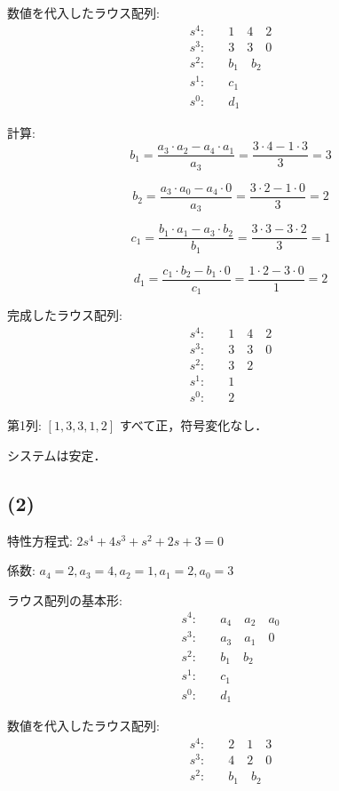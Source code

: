 \documentclass[11pt,a4paper]{ltjsarticle}
\begin{document}
数値を代入したラウス配列:
\begin{align*}
s^4: & \quad 1 \quad 4 \quad 2 \\
s^3: & \quad 3 \quad 3 \quad 0 \\
s^2: & \quad b_1 \quad b_2 \\
s^1: & \quad c_1 \\
s^0: & \quad d_1
\end{align*}

計算:
$$b_1 = \frac{a_3 \cdot a_2 - a_4 \cdot a_1}{a_3} = \frac{3 \cdot 4 - 1 \cdot 3}{3} = 3$$

$$b_2 = \frac{a_3 \cdot a_0 - a_4 \cdot 0}{a_3} = \frac{3 \cdot 2 - 1 \cdot 0}{3} = 2$$

$$c_1 = \frac{b_1 \cdot a_1 - a_3 \cdot b_2}{b_1} = \frac{3 \cdot 3 - 3 \cdot 2}{3} = 1$$

$$d_1 = \frac{c_1 \cdot b_2 - b_1 \cdot 0}{c_1} = \frac{1 \cdot 2 - 3 \cdot 0}{1} = 2$$

完成したラウス配列:
\begin{align*}
s^4: & \quad 1 \quad 4 \quad 2 \\
s^3: & \quad 3 \quad 3 \quad 0 \\
s^2: & \quad 3 \quad 2 \\
s^1: & \quad 1 \\
s^0: & \quad 2
\end{align*}

第1列: $[1, 3, 3, 1, 2]$ すべて正，符号変化なし．

システムは安定．

\subsection{(2)}
特性方程式: $2s^4+4s^3+s^2+2s+3=0$

係数: $a_4=2, a_3=4, a_2=1, a_1=2, a_0=3$

ラウス配列の基本形:
\begin{align*}
s^4: & \quad a_4 \quad a_2 \quad a_0 \\
s^3: & \quad a_3 \quad a_1 \quad 0 \\
s^2: & \quad b_1 \quad b_2 \\
s^1: & \quad c_1 \\
s^0: & \quad d_1
\end{align*}

数値を代入したラウス配列:
\begin{align*}
s^4: & \quad 2 \quad 1 \quad 3 \\
s^3: & \quad 4 \quad 2 \quad 0 \\
s^2: & \quad b_1 \quad b_2 \\
\end{align*}
\end{document}

